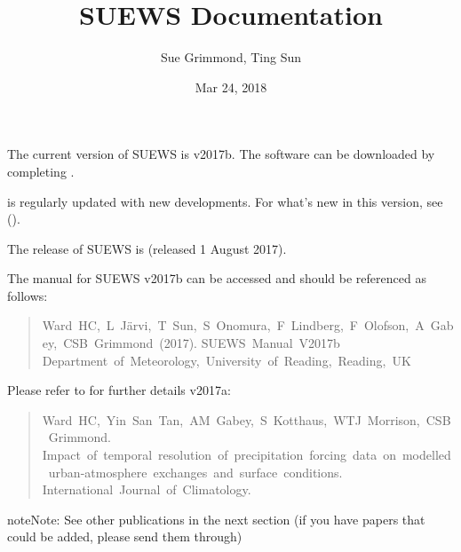 \documentclass[letterpaper,10pt,english]{sphinxmanual}
\title{SUEWS Documentation}
\date{Mar 24, 2018}
\author{Sue Grimmond, Ting Sun}
\begin{document}
\maketitle
\sphinxtableofcontents
{}\label{\detokenize{index::doc}}


The current version of SUEWS is v2017b. The software can be downloaded
by completing .

 is regularly
updated with new developments. For what’s new in this version, see {\hyperref[\detokenize{version-history:new-latest}]{}} ().

The  release of SUEWS is  (released 1 August
2017).

The manual for SUEWS v2017b can be accessed
 and should be referenced as
follows:
\begin{quote}

Ward HC, L Järvi, T Sun, S Onomura, F Lindberg, F Olofson, A Gabey, CSB Grimmond (2017).
SUEWS Manual V2017b Department of Meteorology, University of Reading, Reading, UK
\end{quote}

Please refer to  for
further details v2017a:
\begin{quote}

Ward HC, Yin San Tan, AM Gabey, S Kotthaus, WTJ Morrison, CSB Grimmond.
Impact of temporal resolution of precipitation forcing data on modelled urban-atmosphere exchanges and surface conditions.
International Journal of Climatology.
\end{quote}

\begin{sphinxadmonition}{note}{Note:}
See other publications in the next section (if you have papers that could be added, please send them through)
\end{sphinxadmonition}
\end{document}
